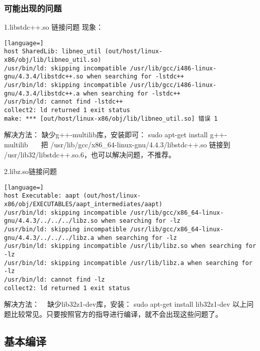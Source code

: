 \documentclass[a4paper,titlepage]{article}
\begin{document}
\subsubsection{可能出现的问题}
1.libstdc++.so 链接问题
现象：
\begin{lstlisting}[language=]
host SharedLib: libneo_util (out/host/linux-x86/obj/lib/libneo_util.so)
/usr/bin/ld: skipping incompatible /usr/lib/gcc/i486-linux-gnu/4.3.4/libstdc++.so when searching for -lstdc++
/usr/bin/ld: skipping incompatible /usr/lib/gcc/i486-linux-gnu/4.3.4/libstdc++.a when searching for -lstdc++
/usr/bin/ld: cannot find -lstdc++
collect2: ld returned 1 exit status
make: *** [out/host/linux-x86/obj/lib/libneo_util.so] 错误 1
\end{lstlisting}
解决方法： 缺少g++-multilib库，安装即可： sudo apt-get install g++-multilib   
把 /usr/lib/gcc/x86_64-linux-gnu/4.4.3/libstdc++.so 链接到
/usr/lib32/libstdc++.so.6，也可以解决问题，不推荐。

2.libz.so链接问题
\begin{lstlisting}[language=]
host Executable: aapt (out/host/linux-x86/obj/EXECUTABLES/aapt_intermediates/aapt) 
/usr/bin/ld: skipping incompatible /usr/lib/gcc/x86_64-linux-gnu/4.4.3/../../../libz.so when searching for -lz 
/usr/bin/ld: skipping incompatible /usr/lib/gcc/x86_64-linux-gnu/4.4.3/../../../libz.a when searching for -lz 
/usr/bin/ld: skipping incompatible /usr/lib/libz.so when searching for -lz 
/usr/bin/ld: skipping incompatible /usr/lib/libz.a when searching for -lz 
/usr/bin/ld: cannot find -lz 
collect2: ld returned 1 exit status 
\end{lstlisting}
解决方法：
  缺少lib32z1-dev库，安装： sudo apt-get install lib32z1-dev
以上问题比较常见。只要按照官方的指导进行编译，就不会出现这些问题了。
\subsection{基本编译}
\end{document}
